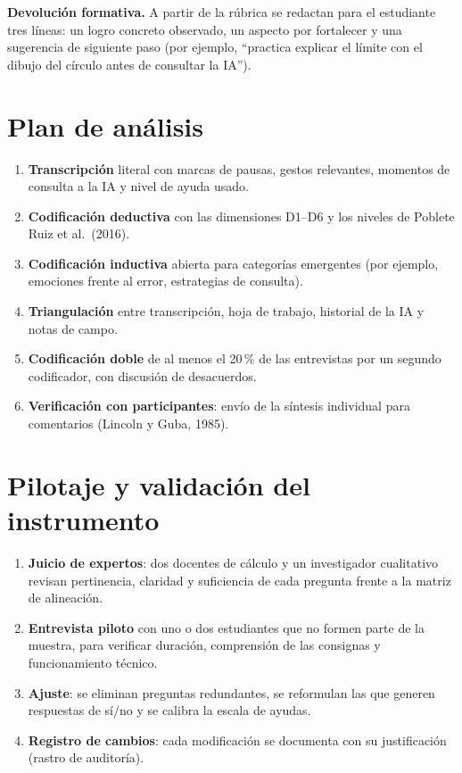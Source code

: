 \documentclass[11pt,letterpaper]{article}
\newcounter{preg}
\begin{document}
\noindent\textbf{Devolución formativa.} A partir de la rúbrica se redactan para el estudiante tres líneas: un logro concreto observado, un aspecto por fortalecer y una sugerencia de siguiente paso (por ejemplo, ``practica explicar el límite con el dibujo del círculo antes de consultar la IA'').

\section{Plan de análisis}
\begin{enumerate}
  \item \textbf{Transcripción} literal con marcas de pausas, gestos relevantes, momentos de consulta a la IA y nivel de ayuda usado.
  \item \textbf{Codificación deductiva} con las dimensiones D1--D6 y los niveles de Poblete Ruiz et al.\ (2016).
  \item \textbf{Codificación inductiva} abierta para categorías emergentes (por ejemplo, emociones frente al error, estrategias de consulta).
  \item \textbf{Triangulación} entre transcripción, hoja de trabajo, historial de la IA y notas de campo.
  \item \textbf{Codificación doble} de al menos el 20\,\% de las entrevistas por un segundo codificador, con discusión de desacuerdos.
  \item \textbf{Verificación con participantes}: envío de la síntesis individual para comentarios (Lincoln y Guba, 1985).
\end{enumerate}

\section{Pilotaje y validación del instrumento}\label{sec:pilotaje}
\begin{enumerate}
  \item \textbf{Juicio de expertos}: dos docentes de cálculo y un investigador cualitativo revisan pertinencia, claridad y suficiencia de cada pregunta frente a la matriz de alineación.
  \item \textbf{Entrevista piloto} con uno o dos estudiantes que no formen parte de la muestra, para verificar duración, comprensión de las consignas y funcionamiento técnico.
  \item \textbf{Ajuste}: se eliminan preguntas redundantes, se reformulan las que generen respuestas de sí/no y se calibra la escala de ayudas.
  \item \textbf{Registro de cambios}: cada modificación se documenta con su justificación (rastro de auditoría).
\end{enumerate}
\end{document}
